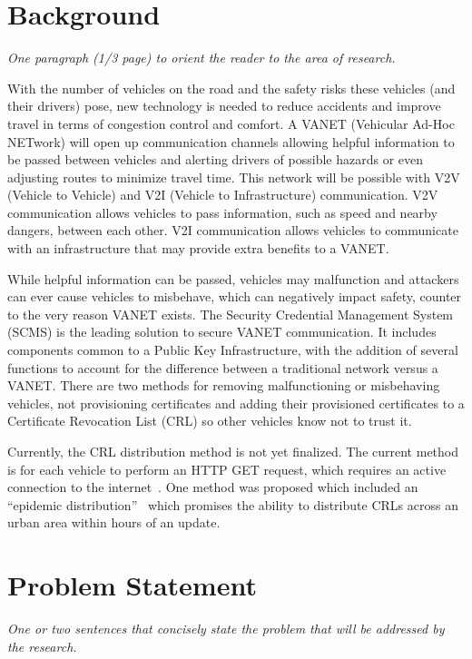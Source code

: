 \documentclass {article}
\newcommand{\sechint}[1]{\small{\emph{#1}} \bigskip}
\begin{document}
\tableofcontents
\pagebreak

\section{Background}{\sechint{One paragraph (1/3 page) to orient the reader to the area of research.}}

With the number of vehicles on the road and the safety risks these vehicles (and their drivers) pose, new technology is needed to reduce accidents and improve travel in terms of congestion control and comfort. A VANET (Vehicular Ad-Hoc NETwork) will open up communication channels allowing helpful information to be passed between vehicles and alerting drivers of possible hazards or even adjusting routes to minimize travel time. This network will be possible with V2V (Vehicle to Vehicle) and V2I (Vehicle to Infrastructure) communication. V2V communication allows vehicles to pass information, such as speed and nearby dangers, between each other. V2I communication allows vehicles to communicate with an infrastructure that may provide extra benefits to a VANET.

While helpful information can be passed, vehicles may malfunction and attackers can ever cause vehicles to misbehave, which can negatively impact safety, counter to the very reason VANET exists. The Security Credential Management System (SCMS) is the leading solution to secure VANET communication. It includes components common to a Public Key Infrastructure, with the addition of several functions to account for the difference between a traditional network versus a VANET. There are two methods for removing malfunctioning or misbehaving vehicles, not provisioning certificates and adding their provisioned certificates to a Certificate Revocation List (CRL) so other vehicles know not to trust it.

Currently, the CRL distribution method is not yet finalized. The current method is for each vehicle to perform an HTTP GET request, which requires an active connection to the internet~\autocite{brecht_scms_nodate}. One method was proposed which included an ``epidemic distribution''~\autocite{haas_efficient_2011} which promises the ability to distribute CRLs across an urban area within hours of an update.

\section{Problem Statement}{\sechint{One or two sentences that concisely state the problem that will be addressed by the research.}}
\end{document}
